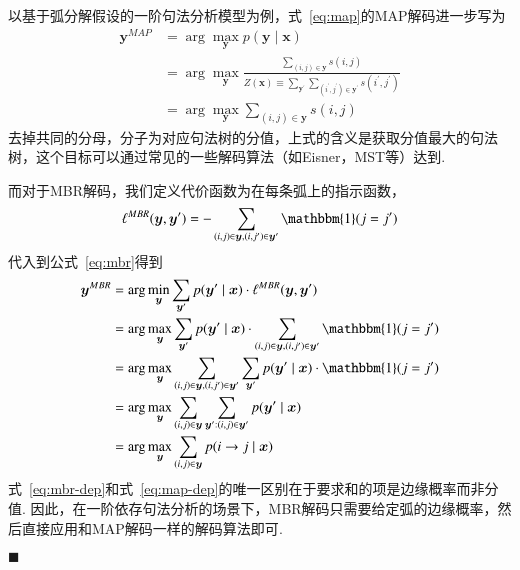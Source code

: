 以基于弧分解假设的一阶句法分析模型为例，式~\ref{eq:map}的MAP解码进一步写为
\begin{equation}
    \label{eq:map-dep}
    \begin{split}
        \boldsymbol{y}^{MAP}&=\arg\max_{\boldsymbol{y}}p(\boldsymbol{y}\mid\boldsymbol{x})\\
        &=\arg\max_{\boldsymbol{y}}\frac{\sum_{(i,j)\in \boldsymbol{y}}s(i,j)}{Z(\boldsymbol{x})\equiv \sum_{\boldsymbol{y}^{\prime}}\sum_{(i^{\prime},j^{\prime})\in \boldsymbol{y}^{\prime}}s(i^{\prime},j^{\prime})}\\
        &=\arg\max_{\boldsymbol{y}}\sum_{(i,j)\in \boldsymbol{y}}s(i,j)
    \end{split}
\end{equation}
去掉共同的分母，分子为对应句法树的分值，上式的含义是获取分值最大的句法树，这个目标可以通过常见的一些解码算法（如Eisner，MST等）达到.

而对于MBR解码，我们定义代价函数为在每条弧上的指示函数，
\begin{equation}
    \ell^{MBR}(\boldsymbol{y},\boldsymbol{y}^{\prime}) = -\sum_{(i,j)\in\boldsymbol{y},(i,j^{\prime})\in\boldsymbol{y}^{\prime}}\mathbbm{1}(j=j^{\prime})
\end{equation}
代入到公式~\ref{eq:mbr}得到
\begin{equation}
    \label{eq:mbr-dep}
    \begin{split}
        \boldsymbol{y}^{MBR}&= \arg\min_{\boldsymbol{y}}\sum_{\boldsymbol{y}^{\prime}}p(\boldsymbol{y}^{\prime}\mid\boldsymbol{x})\cdot\ell^{MBR}(\boldsymbol{y},\boldsymbol{y}^{\prime})\\
        &=\arg\max_{\boldsymbol{y}}\sum_{\boldsymbol{y}^{\prime}}p(\boldsymbol{y}^{\prime}\mid\boldsymbol{x})\cdot\sum_{(i,j)\in\boldsymbol{y},(i,j^{\prime})\in\boldsymbol{y}^{\prime}}\mathbbm{1}(j=j^{\prime})\\
        &=\arg\max_{\boldsymbol{y}}\sum_{(i,j)\in\boldsymbol{y},(i,j^{\prime})\in\boldsymbol{y}^{\prime}}\sum_{\boldsymbol{y}^{\prime}}p(\boldsymbol{y}^{\prime}\mid\boldsymbol{x})\cdot\mathbbm{1}(j=j^{\prime})\\
        &=\arg\max_{\boldsymbol{y}}\sum_{(i,j)\in\boldsymbol{y}}\sum_{\boldsymbol{y}^{\prime}:(i,j)\in \boldsymbol{y}^{\prime}}p(\boldsymbol{y}^{\prime}\mid\boldsymbol{x})\\
        &=\arg\max_{\boldsymbol{y}}\sum_{(i,j)\in\boldsymbol{y}}p(i\rightarrow j\mid\boldsymbol{x})
    \end{split}
\end{equation}
式~\ref{eq:mbr-dep}和式~\ref{eq:map-dep}的唯一区别在于要求和的项是边缘概率而非分值.
因此，在一阶依存句法分析的场景下，MBR解码只需要给定弧的边缘概率，然后直接应用和MAP解码一样的解码算法即可\cite{smith-smith-2007-probabilistic, smith-2011-linguistic}.

\noindent$\blacksquare$

